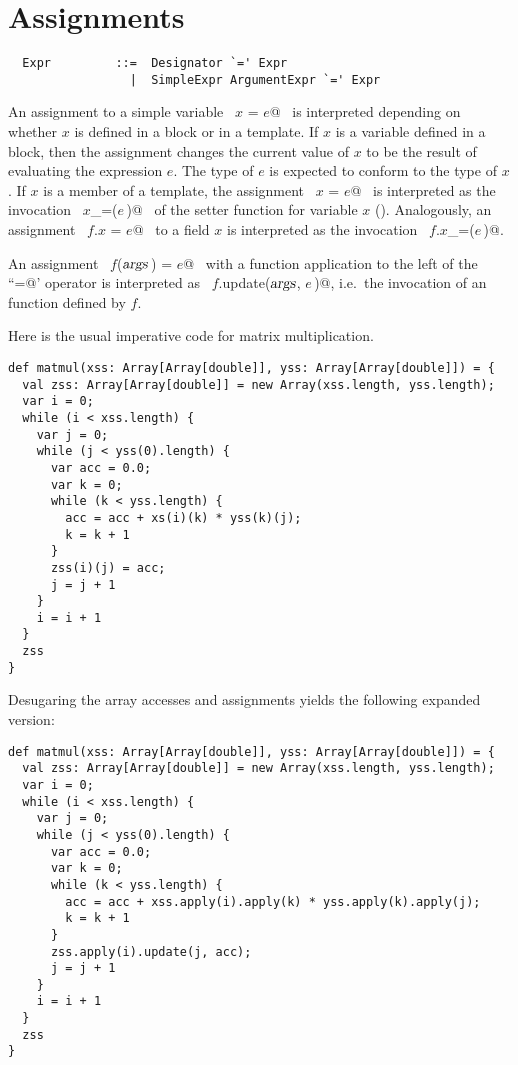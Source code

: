 \documentclass[a4paper,12pt,twoside,titlepage]{book}
\newcommand{\args}{\mbox{\sl args}}
\begin{document}
\section{Assignments}

\syntax\begin{lstlisting}
  Expr         ::=  Designator `=' Expr
                 |  SimpleExpr ArgumentExpr `=' Expr
\end{lstlisting}

An assignment to a simple variable ~\lstinline@$x$ = $e$@~ is interpreted
depending on whether $x$ is defined in a block or in a
template. If $x$ is a variable defined in a block, then the
assignment changes the current value of $x$ to be the result of
evaluating the expression $e$. The type of $e$ is expected
to conform to the type of $x$.  If $x$ is a member
of a template, the assignment ~\lstinline@$x$ = $e$@~ is interpreted as the
invocation ~\lstinline@$x$_=($e\,$)@~ of the setter function for variable $x$
().  Analogously, an assignment ~\lstinline@$f$.$x$ = $e$@~ to a
field $x$ is interpreted as the invocation ~\lstinline@$f$.$x$_=($e\,$)@.

An assignment ~\lstinline@$f$($\args\,$) = $e$@~ with a function application to the
left of the ``\lstinline@=@' operator is interpreted as 
~\lstinline@$f$.update($\args$, $e\,$)@, i.e.\
the invocation of an  function defined by $f$.

\example \label{ex:imp-mat-mul}
Here is the usual imperative code for matrix multiplication.

\begin{lstlisting}
def matmul(xss: Array[Array[double]], yss: Array[Array[double]]) = {
  val zss: Array[Array[double]] = new Array(xss.length, yss.length);
  var i = 0;
  while (i < xss.length) {
    var j = 0;
    while (j < yss(0).length) {
      var acc = 0.0;
      var k = 0;
      while (k < yss.length) {
        acc = acc + xs(i)(k) * yss(k)(j);
        k = k + 1
      }
      zss(i)(j) = acc;
      j = j + 1
    }
    i = i + 1
  }
  zss
}
\end{lstlisting}
Desugaring the array accesses and assignments yields the following
expanded version:
\begin{lstlisting}
def matmul(xss: Array[Array[double]], yss: Array[Array[double]]) = {
  val zss: Array[Array[double]] = new Array(xss.length, yss.length);
  var i = 0;
  while (i < xss.length) {
    var j = 0;
    while (j < yss(0).length) {
      var acc = 0.0;
      var k = 0;
      while (k < yss.length) {
        acc = acc + xss.apply(i).apply(k) * yss.apply(k).apply(j);
        k = k + 1
      }
      zss.apply(i).update(j, acc);
      j = j + 1
    }
    i = i + 1
  }
  zss
}
\end{lstlisting}
\end{document}
